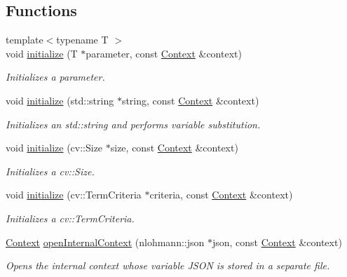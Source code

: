 \subsection*{Functions}
\begin{DoxyCompactItemize}
\item 
{\footnotesize template$<$typename T $>$ }\\void \hyperlink{namespacestereo__ugv_a6971cc11001fdf589a71f6fb3099c65b}{initialize} (T $\ast$parameter, const \hyperlink{classstereo__ugv_1_1Context}{Context} \&context)
\begin{DoxyCompactList}\small\item\em Initializes a parameter. \end{DoxyCompactList}\item 
void \hyperlink{namespacestereo__ugv_aaa158ec1ee9178414843adbbb91a394b}{initialize} (std\+::string $\ast$string, const \hyperlink{classstereo__ugv_1_1Context}{Context} \&context)
\begin{DoxyCompactList}\small\item\em Initializes an std\+::string and performs variable substitution. \end{DoxyCompactList}\item 
void \hyperlink{namespacestereo__ugv_adab204dc6f43824bcda4cd5e172d2812}{initialize} (cv\+::\+Size $\ast$size, const \hyperlink{classstereo__ugv_1_1Context}{Context} \&context)
\begin{DoxyCompactList}\small\item\em Initializes a cv\+::\+Size. \end{DoxyCompactList}\item 
void \hyperlink{namespacestereo__ugv_a0a98148c84d1f085ac51c2f2fb7c8e7a}{initialize} (cv\+::\+Term\+Criteria $\ast$criteria, const \hyperlink{classstereo__ugv_1_1Context}{Context} \&context)
\begin{DoxyCompactList}\small\item\em Initializes a cv\+::\+Term\+Criteria. \end{DoxyCompactList}\item 
\hyperlink{classstereo__ugv_1_1Context}{Context} \hyperlink{namespacestereo__ugv_aef8f9a951e11f9d5d178db99754aac4b}{open\+Internal\+Context} (nlohmann\+::json $\ast$json, const \hyperlink{classstereo__ugv_1_1Context}{Context} \&context)
\begin{DoxyCompactList}\small\item\em Opens the internal context whose variable J\+S\+ON is stored in a separate file. \end{DoxyCompactList}\item 

\end{DoxyCompactItemize}
